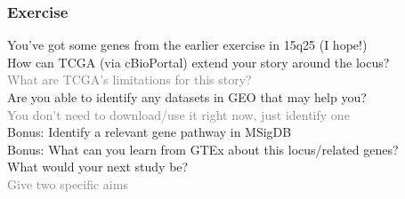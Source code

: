 \documentclass{beamer}
\newcommand{\si}[1]{\hspace{.5cm} \textcolor{gray} {#1}\\}
\begin{document}
{\begin{frame}[t]
\frametitle{Exercise}
You've got some genes from the earlier exercise in 15q25 (I hope!)\\
\vspace{.2cm}
How can TCGA (via cBioPortal) extend your story around the locus?\\
\si{What are TCGA's limitations for this story?}
\vspace{.2cm}
Are you able to identify any datasets in GEO that may help you?\\
\si{You don't need to download/use it right now, just identify one}
\vspace{.2cm}
Bonus: Identify a relevant gene pathway in MSigDB\\
\vspace{.2cm}
Bonus: What can you learn from GTEx about this locus/related genes?\\
\vspace{.2cm}
What would your next study be?\\
\si{Give two specific aims}
\end{frame}

}
\end{document}
